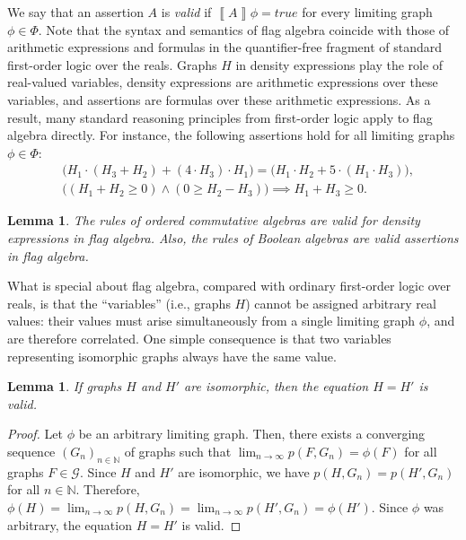 \documentclass{article}
\newtheorem{lem}[thm]{Lemma}
\newcommand*{\strue}{\textit{true}}
\newcommand*{\db}[1]{\left\llbracket #1 \right\rrbracket}
\begin{document}
We say that an assertion $A$ is \emph{valid} if $\db{A}\phi = \strue$ for every limiting graph $\phi \in \Phi$.
Note that the syntax and semantics of flag algebra coincide with those of arithmetic expressions and formulas in the quantifier-free fragment of standard first-order logic over the reals. Graphs $H$ in density expressions play the role of real-valued variables, density expressions are arithmetic expressions over these variables, and assertions are formulas over these arithmetic expressions. As a result, many standard reasoning principles from first-order logic apply to flag algebra directly.
For instance, the following assertions hold for all limiting graphs $\phi \in \Phi$:
\begin{align*}
  & \Big(H_1 \cdot (H_3 + H_2) + (4 \cdot H_3) \cdot H_1\Big) = \Big(H_1 \cdot H_2 + 5 \cdot (H_1 \cdot H_3)\Big),
  \\
  & \Big((H_1 + H_2 \geq 0) \wedge (0 \geq H_2 - H_3)\Big) \implies H_1 + H_3 \geq 0.
\end{align*}

\begin{lem}
  \label{lemma:basic-algebra}
  The rules of ordered commutative algebras are valid for density expressions in flag algebra. Also, the rules of Boolean algebras are valid assertions in flag algebra.
\end{lem}

What is special about flag algebra, compared with ordinary first-order logic over reals, is that the ``variables'' (i.e., graphs $H$) cannot be assigned arbitrary real values: their values must arise simultaneously from a single limiting graph $\phi$, and are therefore correlated.
One simple consequence is that two variables representing isomorphic graphs always have the same value.
\begin{lem}
  \label{lemma:isomorphism}
  If graphs $H$ and $H'$ are isomorphic, then the equation $H = H'$ is valid.
\end{lem}
\begin{proof}
  Let $\phi$ be an arbitrary limiting graph. Then, there exists 
  a converging sequence $(G_n)_{n \in \mathbb{N}}$ of graphs such that 
  $\lim_{n \to \infty} p(F,G_n) = \phi(F)$ for all graphs $F \in \mathcal{G}$. Since $H$ and $H'$ are isomorphic, we have $p(H,G_n) = p(H',G_n)$ for all $n \in \mathbb{N}$. Therefore, $\phi(H) = \lim_{n \to \infty} p(H,G_n) = \lim_{n \to \infty} p(H',G_n) = \phi(H')$. Since $\phi$ was arbitrary, the equation $H = H'$ is valid.
\end{proof}
\end{document}
